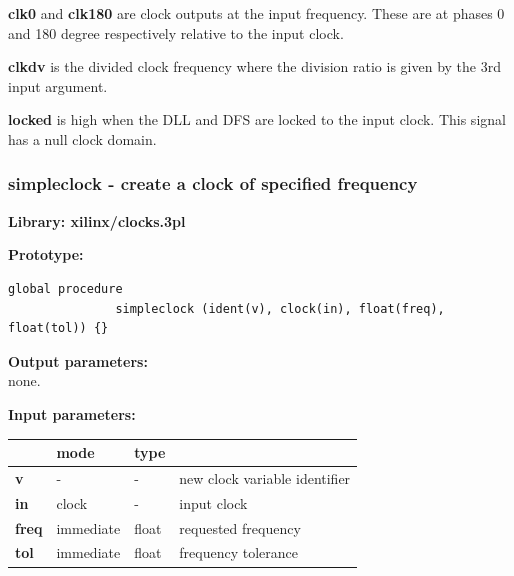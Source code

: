 
                {\bf clk0} and {\bf clk180} are clock
                outputs at the input frequency. These are at phases 0 and 180
                degree respectively relative to the input clock.

                {\bf clkdv} is the divided clock frequency where the division ratio
                is given by the 3rd input argument.

                {\bf locked} is high when the DLL and DFS are locked to the input
                clock. This signal has a null clock domain.






        \subsubsection{simpleclock - create a clock of specified frequency}\label{sec:lpsimpleclock}
            
            {\bf Library: xilinx/clocks.3pl}

            {\bf Prototype:} \\
            \vsp
            \begin{lstlisting}[gobble=12, language=threepl]
               global procedure
               simpleclock (ident(v), clock(in), float(freq), float(tol)) {}
            \end{lstlisting}

            {\bf Output parameters:} \\
            none.

            {\bf Input parameters:} \\            
            \begin{tabular}{| l | l | l | l |}
            \hline
                                          & mode  & type   & \\
            \hline \hline
            {\bf v}     & -         & -       & new clock variable identifier \\ \hline
            {\bf in}    & clock     & -       & input clock                   \\ \hline
            {\bf freq}  & immediate & float   & requested frequency           \\ \hline
            {\bf tol}   & immediate & float   & frequency tolerance           \\ \hline
            \end{tabular}

